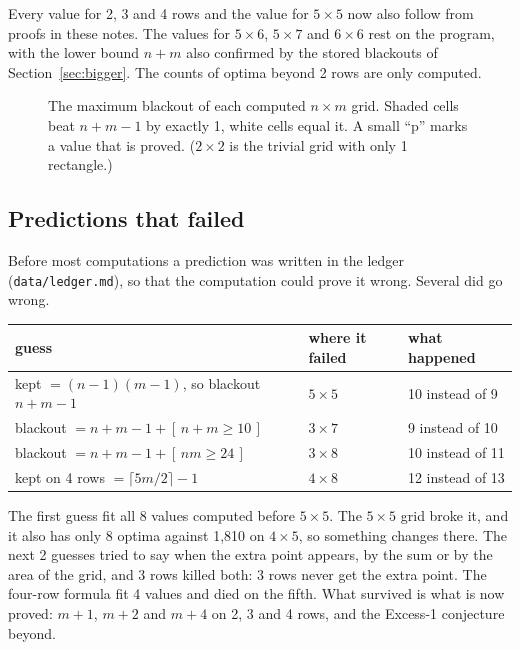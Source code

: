 \documentclass[11pt]{article}
\theoremstyle{definition}
\theoremstyle{remark}
\begin{document}
Every value for 2, 3 and 4 rows and the value for $5\times5$ now also follow from proofs in these
notes. The values for $5\times6$, $5\times7$ and $6\times6$ rest on the program, with the lower
bound $n+m$ also confirmed by the stored blackouts of Section~\ref{sec:bigger}. The counts of
optima beyond 2 rows are only computed.

\begin{figure}[htbp]
\centering

\caption{The maximum blackout of each computed $n\times m$ grid. Shaded cells beat $n+m-1$ by
exactly 1, white cells equal it. A small ``p'' marks a value that is proved. ($2\times2$ is the
trivial grid with only 1 rectangle.)}
\label{fig:excess}
\end{figure}

\subsection{Predictions that failed}

Before most computations a prediction was written in the ledger (\texttt{data/ledger.md}), so
that the computation could prove it wrong. Several did go wrong.

\begin{center}\small
\begin{tabular}{lll}
\toprule
guess & where it failed & what happened \\
\midrule
kept $=(n-1)(m-1)$, so blackout $n+m-1$ & $5\times5$ & 10 instead of 9 \\
blackout $=n+m-1+[\,n+m\ge10\,]$ & $3\times7$ & 9 instead of 10 \\
blackout $=n+m-1+[\,nm\ge24\,]$ & $3\times8$ & 10 instead of 11 \\
kept on 4 rows $=\lceil5m/2\rceil-1$ & $4\times8$ & 12 instead of 13 \\
\bottomrule
\end{tabular}
\end{center}

The first guess fit all 8 values computed before $5\times5$. The $5\times5$ grid broke it, and it
also has only 8 optima against 1,810 on $4\times5$, so something changes there. The next 2 guesses
tried to say when the extra point appears, by the sum or by the area of the grid, and 3 rows
killed both: 3 rows never get the extra point. The four-row formula fit 4 values and died on the
fifth. What survived is what is now proved: $m+1$, $m+2$ and $m+4$ on 2, 3 and 4 rows, and the
Excess-1 conjecture beyond.
\end{document}
